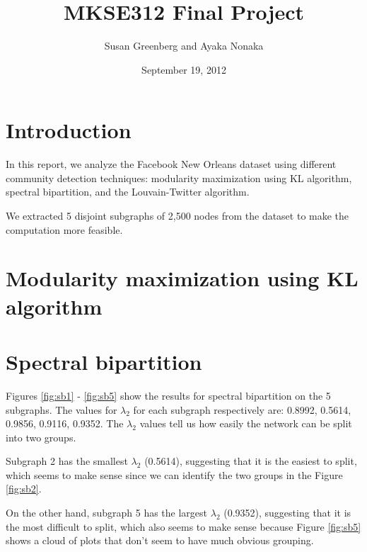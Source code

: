 \documentclass[11pt]{article}
\date{September 19, 2012}
\title{
MKSE312 Final Project
}
\author{
Susan Greenberg and Ayaka Nonaka
}
\begin{document}
\maketitle

\section{Introduction}
In this report, we analyze the Facebook New Orleans dataset using different community detection techniques: modularity maximization using KL algorithm, spectral bipartition, and the Louvain-Twitter algorithm.

We extracted 5 disjoint subgraphs of 2,500 nodes from the dataset to make the computation more feasible.

\section{Modularity maximization using KL algorithm}

\section{Spectral bipartition}
Figures \ref{fig:sb1} - \ref{fig:sb5} show the results for spectral bipartition on the 5 subgraphs. The values for $\lambda_2$ for each subgraph respectively are: 0.8992, 0.5614, 0.9856, 0.9116, 0.9352. The $\lambda_2$ values tell us how easily the network can be split into two groups.

Subgraph 2 has the smallest $\lambda_2$ (0.5614), suggesting that it is the easiest to split, which seems to make sense since we can identify the two groups in the Figure \ref{fig:sb2}.

On the other hand, subgraph 5 has the largest $\lambda_2$ (0.9352), suggesting that it is the most difficult to split, which also seems to make sense because Figure \ref{fig:sb5} shows a cloud of plots that don't seem to have much obvious grouping.
\end{document}
